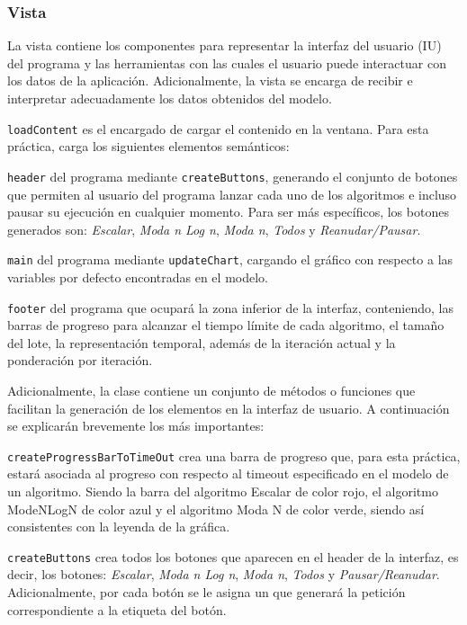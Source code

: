 \subsubsection{Vista}

La vista contiene los componentes para representar la interfaz del usuario (IU) del programa y las herramientas con las cuales el usuario puede interactuar con los datos de la aplicación. Adicionalmente, la vista se encarga de recibir e interpretar adecuadamente los datos obtenidos del modelo.\bigskip

\texttt{loadContent} es el encargado de cargar el contenido en la ventana. Para esta práctica, carga los siguientes elementos semánticos:\bigskip

\texttt{header} del programa mediante \texttt{createButtons}, generando el conjunto de botones que permiten al usuario del programa lanzar cada uno de los algoritmos e incluso pausar su ejecución en cualquier momento. Para ser más específicos, los botones generados son: \textit{Escalar}, \textit{Moda n Log n}, \textit{Moda n}, \textit{Todos} y \textit{Reanudar/Pausar}.\bigskip

\texttt{main} del programa mediante \texttt{updateChart}, cargando el gráfico con respecto a las variables por defecto encontradas en el modelo.\bigskip

\texttt{footer} del programa que ocupará la zona inferior de la interfaz, conteniendo, las barras de progreso para alcanzar el tiempo límite de cada algoritmo, el tamaño del lote, la representación temporal, además de la iteración actual y la ponderación por iteración.\bigskip

Adicionalmente, la clase contiene un conjunto de métodos o funciones que facilitan la generación de los elementos en la interfaz de usuario. A continuación se explicarán brevemente los más importantes:\bigskip

\texttt{createProgressBarToTimeOut} crea una barra de progreso que, para esta práctica, estará asociada al progreso con respecto al timeout especificado en el modelo de un algoritmo. Siendo la barra del algoritmo Escalar de color rojo, el algoritmo ModeNLogN de color azul y el algoritmo Moda N de color verde, siendo así consistentes con la leyenda de la gráfica.\bigskip

\texttt{createButtons} crea todos los botones que aparecen en el header de la interfaz, es decir, los botones: \textit{Escalar}, \textit{Moda n Log n}, \textit{Moda n}, \textit{Todos} y \textit{Pausar/Reanudar}. Adicionalmente, por cada botón se le asigna un  que generará la petición correspondiente a la etiqueta del botón.\bigskip

